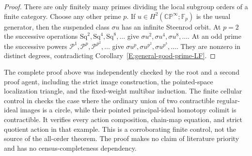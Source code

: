 \begin{proof}
There are only finitely many primes dividing the local subgroup
orders of a finite category.  Choose any other prime $p$.  If
$u\in H^2(\mathbb{CP}^{\infty};\mathbb F_p)$ is the usual generator,
then the suspended class $\sigma u$ has an infinite Steenrod orbit.
At $p=2$ the successive operations
$\mathrm{Sq}^{2},\mathrm{Sq}^{4},\mathrm{Sq}^{8},\ldots$ give
$\sigma u^2,\sigma u^4,\sigma u^8,\ldots$.  At an odd prime the
successive powers $\mathcal P^1,\mathcal P^p,\mathcal P^{p^2},\ldots$
give $\sigma u^p,\sigma u^{p^2},\sigma u^{p^3},\ldots$.
They are nonzero in distinct degrees, contradicting
Corollary~\ref{E:general-good-prime-LF}.
\end{proof}

\begin{remark}\label{E:general-audit}
The complete proof above was independently checked by the root and a
second proof agent, including the strict image construction, the
pointed-space localization triangle, and the fixed-weight multibar
induction.  The finite cellular control in
 checks the case where the
ordinary union of two contractible regular-ideal images is a circle,
while their pointed principal-ideal homotopy colimit is contractible.
It verifies every action composition, chain-map equation, and strict
quotient action in that example.  This is a corroborating finite
control, not the source of the all-order theorem.  The proof makes
no claim of literature priority and has no census-completeness
dependency.
\end{remark}

